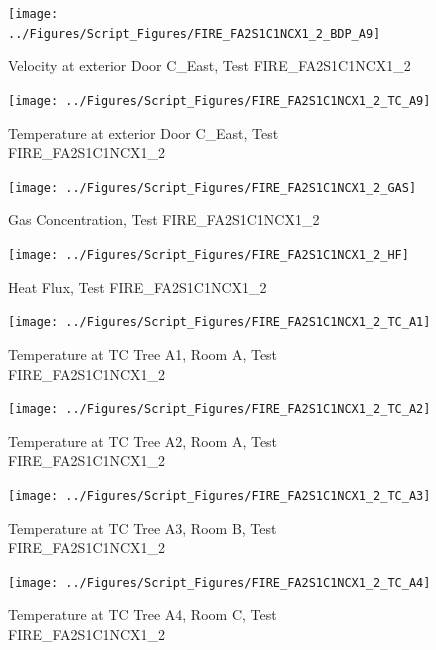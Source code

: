 \documentclass[12pt,oneside]{book}
\begin{document}
\begin{figure}[!ht]
\texttt{[image: ../Figures/Script\_Figures/FIRE\_FA2S1C1NCX1\_2\_BDP\_A9]}
\caption{Velocity at exterior Door C\_East, Test FIRE\_FA2S1C1NCX1\_2}
\label{fig:FIRE_FA2S1C1NCX1_2_BDP_A9}
\end{figure}

\begin{figure}[!ht]
\texttt{[image: ../Figures/Script\_Figures/FIRE\_FA2S1C1NCX1\_2\_TC\_A9]}
\caption{Temperature at exterior Door C\_East, Test FIRE\_FA2S1C1NCX1\_2}
\label{fig:FIRE_FA2S1C1NCX1_2_TC_A9}
\end{figure}

\begin{figure}[!ht]
\texttt{[image: ../Figures/Script\_Figures/FIRE\_FA2S1C1NCX1\_2\_GAS]}
\caption{Gas Concentration, Test FIRE\_FA2S1C1NCX1\_2}
\label{fig:FIRE_FA2S1C1NCX1_2_GAS}
\end{figure}

\begin{figure}[!ht]
\texttt{[image: ../Figures/Script\_Figures/FIRE\_FA2S1C1NCX1\_2\_HF]}
\caption{Heat Flux, Test FIRE\_FA2S1C1NCX1\_2}
\label{fig:FIRE_FA2S1C1NCX1_2_HF}
\end{figure}

\begin{figure}[!ht]
\texttt{[image: ../Figures/Script\_Figures/FIRE\_FA2S1C1NCX1\_2\_TC\_A1]}
\caption{Temperature at TC Tree A1, Room A, Test FIRE\_FA2S1C1NCX1\_2}
\label{fig:FIRE_FA2S1C1NCX1_2_TC_A1}
\end{figure}

\begin{figure}[!ht]
\texttt{[image: ../Figures/Script\_Figures/FIRE\_FA2S1C1NCX1\_2\_TC\_A2]}
\caption{Temperature at TC Tree A2, Room A, Test FIRE\_FA2S1C1NCX1\_2}
\label{fig:FIRE_FA2S1C1NCX1_2_TC_A2}
\end{figure}

\begin{figure}[!ht]
\texttt{[image: ../Figures/Script\_Figures/FIRE\_FA2S1C1NCX1\_2\_TC\_A3]}
\caption{Temperature at TC Tree A3, Room B, Test FIRE\_FA2S1C1NCX1\_2}
\label{fig:FIRE_FA2S1C1NCX1_2_TC_A3}
\end{figure}

\begin{figure}[!ht]
\texttt{[image: ../Figures/Script\_Figures/FIRE\_FA2S1C1NCX1\_2\_TC\_A4]}
\caption{Temperature at TC Tree A4, Room C, Test FIRE\_FA2S1C1NCX1\_2}
\label{fig:FIRE_FA2S1C1NCX1_2_TC_A4}
\end{figure}
\end{document}
